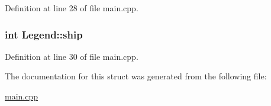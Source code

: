 Definition at line 28 of file main.\+cpp.

\hypertarget{struct_legend_a637b6959e10df0779b48fdea71e7999d}{
\subsubsection[{ship}]{\setlength{\rightskip}{0pt plus 5cm}int Legend\+::ship}}\label{struct_legend_a637b6959e10df0779b48fdea71e7999d}


Definition at line 30 of file main.\+cpp.



The documentation for this struct was generated from the following file\+:\begin{DoxyCompactItemize}
\item 
\hyperlink{main_8cpp}{main.\+cpp}\end{DoxyCompactItemize}
